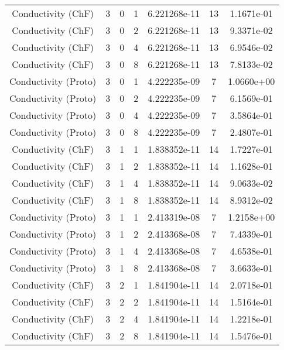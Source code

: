 \documentclass{article}
\begin{document}
\begin{small} 
  \begin{table} 
    \begin{center}
      \begin{tabular}{|c|c|c|c|c|c||c|} \hline 
        \hline 
        Conductivity    (ChF) & 3 & 0 & 1& 6.221268e-11 & 13 & 1.1671e-01\\
        Conductivity    (ChF) & 3 & 0 & 2& 6.221268e-11 & 13 & 9.3371e-02\\
        Conductivity    (ChF) & 3 & 0 & 4& 6.221268e-11 & 13 & 6.9546e-02\\
        Conductivity    (ChF) & 3 & 0 & 8& 6.221268e-11 & 13 & 7.8133e-02\\
        Conductivity  (Proto) & 3 & 0 & 1& 4.222235e-09 & 7 & 1.0660e+00\\
        Conductivity  (Proto) & 3 & 0 & 2& 4.222235e-09 & 7 & 6.1569e-01\\
        Conductivity  (Proto) & 3 & 0 & 4& 4.222235e-09 & 7 & 3.5864e-01\\
        Conductivity  (Proto) & 3 & 0 & 8& 4.222235e-09 & 7 & 2.4807e-01\\
        \hline 
        Conductivity    (ChF) & 3 & 1 & 1& 1.838352e-11 & 14 & 1.7227e-01\\
        Conductivity    (ChF) & 3 & 1 & 2& 1.838352e-11 & 14 & 1.1628e-01\\
        Conductivity    (ChF) & 3 & 1 & 4& 1.838352e-11 & 14 & 9.0633e-02\\
        Conductivity    (ChF) & 3 & 1 & 8& 1.838352e-11 & 14 & 8.9312e-02\\
        Conductivity  (Proto) & 3 & 1 & 1& 2.413319e-08 & 7 & 1.2158e+00\\
        Conductivity  (Proto) & 3 & 1 & 2& 2.413368e-08 & 7 & 7.4339e-01\\
        Conductivity  (Proto) & 3 & 1 & 4& 2.413368e-08 & 7 & 4.6538e-01\\
        Conductivity  (Proto) & 3 & 1 & 8& 2.413368e-08 & 7 & 3.6633e-01\\
        \hline 
        Conductivity    (ChF) & 3 & 2 & 1& 1.841904e-11 & 14 & 2.0718e-01\\
        Conductivity    (ChF) & 3 & 2 & 2& 1.841904e-11 & 14 & 1.5164e-01\\
        Conductivity    (ChF) & 3 & 2 & 4& 1.841904e-11 & 14 & 1.2218e-01\\
        Conductivity    (ChF) & 3 & 2 & 8& 1.841904e-11 & 14 & 1.5476e-01\\

\end{tabular}
\end{center}
\end{table}
\end{small}
\end{document}
